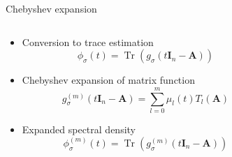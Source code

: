\documentclass[aspectratio=169, leqno, 12pt]{beamer}
\newcommand{\mtx}[1]{\boldsymbol{#1}}
\DeclareMathOperator{\Tr}{Tr}
\begin{document}
\begin{frame}{Chebyshev expansion}
    \begin{columns}
        \begin{column}{0.55\textwidth}
            \begin{itemize}
                \item Conversion to trace estimation
                \begin{equation}
                    \phi_{\sigma}(t) = \Tr(g_{\sigma}(t \mtx{I}_n - \mtx{A}))
                \end{equation}
                \item Chebyshev expansion of matrix function
                \begin{equation}
                    g_{\sigma}^{(m)}(t \mtx{I}_n - \mtx{A}) = \sum_{l=0}^m \mu_l(t) T_l(\mtx{A})
                \end{equation}
                \item Expanded spectral density
                \begin{equation}
                    \phi_{\sigma}^{(m)}(t) = \Tr(g_{\sigma}^{(m)}(t \mtx{I}_n - \mtx{A}))
                \end{equation}
            \end{itemize}
        \end{column}
        \begin{column}{0.45\textwidth}
            \scalebox{0.65}{}
        \end{column}
    \end{columns}
\end{frame}
\end{document}
